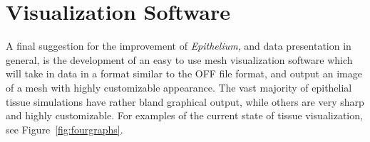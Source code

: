 \section{Visualization Software }
A final suggestion for the improvement of \emph{Epithelium}, and data presentation in general, is the development of an easy to use mesh visualization software which will take in data in a format similar to the OFF file format, and output an image of a mesh with highly customizable appearance. The vast majority of epithelial tissue simulations have rather bland graphical output, while others are very sharp and highly customizable. For examples of the current state of tissue visualization, see Figure~\ref{fig:fourgraphs}. 

